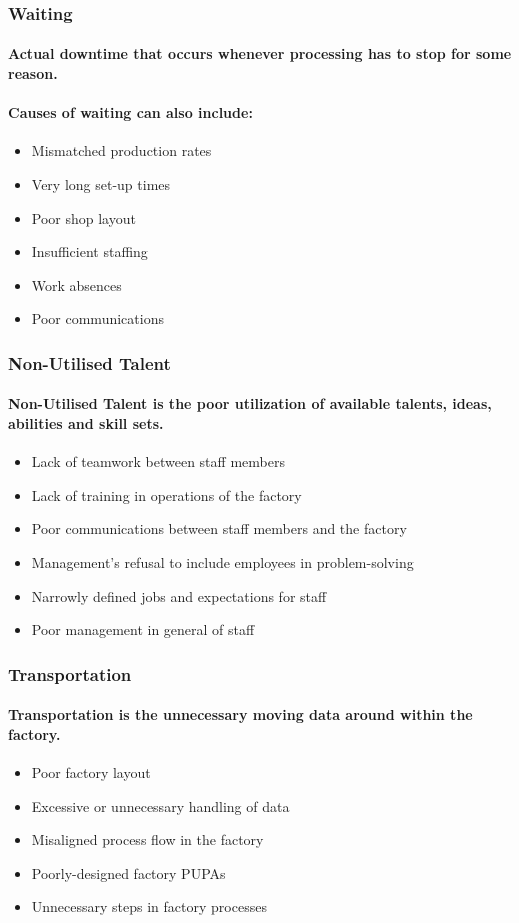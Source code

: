 \documentclass{acm_proc_article-sp}
\begin{document}
\subsubsection{Waiting}
\paragraph{Actual downtime that occurs whenever processing has to stop for some reason.}
\paragraph{Causes of waiting can also include:}
\begin{itemize}
\item Mismatched production rates
\item Very long set-up times
\item Poor shop layout
\item Insufficient staffing
\item Work absences
\item Poor communications
\end{itemize}
\subsubsection{Non-Utilised Talent}
\paragraph{Non-Utilised Talent is the poor utilization of available talents, ideas, abilities and skill sets.}
\begin{itemize}
\item Lack of teamwork between staff members
\item Lack of training in operations of the factory
\item Poor communications between staff members and the factory
\item Management's refusal to include employees in problem-solving
\item Narrowly defined jobs and expectations for staff
\item Poor management in general of staff
\end{itemize}
\subsubsection{Transportation}
\paragraph{Transportation is the unnecessary moving data around within the factory.}
\begin{itemize}
\item Poor factory layout
\item Excessive or unnecessary handling of data
\item Misaligned process flow in the factory
\item Poorly-designed factory PUPAs
\item Unnecessary steps in factory processes
\end{itemize}
\end{document}
